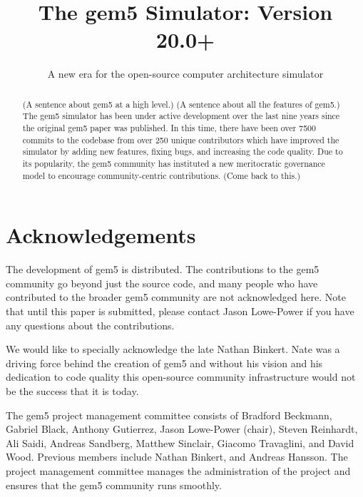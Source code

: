 \documentclass[manuscript, review, screen, timestamp]{acmart}
\begin{document}
\title{The gem5 Simulator: Version 20.0+}
\subtitle{A new era for the open-source computer architecture simulator}
%



\begin{abstract}
    (A sentence about gem5 at a high level.)
    (A sentence about all the features of gem5.)
    The gem5 simulator has been under active development over the last nine years since the original gem5 paper was published.
    In this time, there have been over 7500 commits to the codebase from over 250 unique contributors which have improved the simulator by adding new features, fixing bugs, and increasing the code quality.
    Due to its popularity, the gem5 community has instituted a new meritocratic governance model to encourage community-centric contributions.
    (Come back to this.)
\end{abstract}

\maketitle
\renewcommand{\shortauthors}{Lowe-Power and the gem5 Community}





\section{Acknowledgements}

The development of gem5 is distributed.
The contributions to the gem5 community go beyond just the source code, and many people who have contributed to the broader gem5 community are not acknowledged here.
Note that until this paper is submitted, please contact Jason Lowe-Power if you have any questions about the contributions.

We would like to specially acknowledge the late Nathan Binkert.
Nate was a driving force behind the creation of gem5 and without his vision and his dedication to code quality this open-source community infrastructure would not be the success that it is today.

The gem5 project management committee consists of Bradford Beckmann, Gabriel Black, Anthony Gutierrez, Jason Lowe-Power (chair), Steven Reinhardt, Ali Saidi, Andreas Sandberg, Matthew Sinclair, Giacomo Travaglini, and David Wood.
Previous members include Nathan Binkert, and Andreas Hansson.
The project management committee manages the administration of the project and ensures that the gem5 community runs smoothly.
\end{document}
